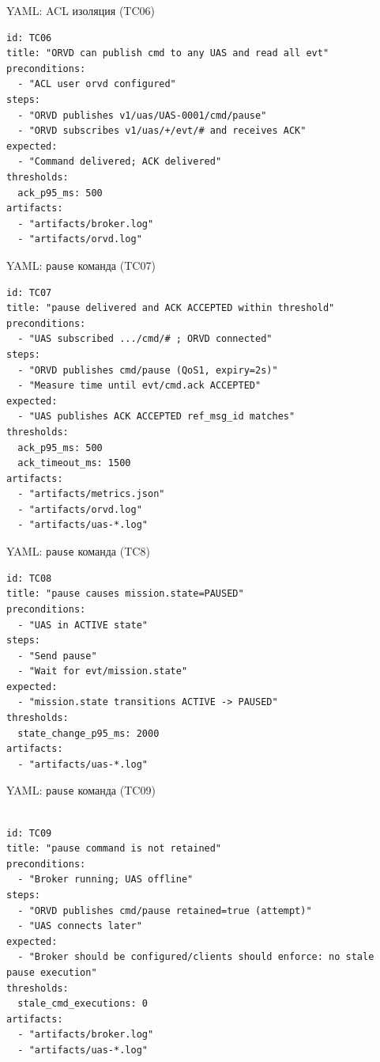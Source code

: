 \documentclass[aspectratio=169]{beamer}
\begin{document}
\begin{frame}[fragile]{YAML: ACL изоляция (TC06)}
\begin{Verbatim}[fontsize=\scriptsize, baselinestretch=0.85]  
  id: TC06
title: "ORVD can publish cmd to any UAS and read all evt"
preconditions:
  - "ACL user orvd configured"
steps:
  - "ORVD publishes v1/uas/UAS-0001/cmd/pause"
  - "ORVD subscribes v1/uas/+/evt/# and receives ACK"
expected:
  - "Command delivered; ACK delivered"
thresholds:
  ack_p95_ms: 500
artifacts:
  - "artifacts/broker.log"
  - "artifacts/orvd.log"
\end{Verbatim}
\end{frame}

\begin{frame}[fragile]{YAML: \texttt{pause} команда (TC07)}
\begin{Verbatim}[fontsize=\scriptsize, baselinestretch=0.85]
id: TC07
title: "pause delivered and ACK ACCEPTED within threshold"
preconditions:
  - "UAS subscribed .../cmd/# ; ORVD connected"
steps:
  - "ORVD publishes cmd/pause (QoS1, expiry=2s)"
  - "Measure time until evt/cmd.ack ACCEPTED"
expected:
  - "UAS publishes ACK ACCEPTED ref_msg_id matches"
thresholds:
  ack_p95_ms: 500
  ack_timeout_ms: 1500
artifacts:
  - "artifacts/metrics.json"
  - "artifacts/orvd.log"
  - "artifacts/uas-*.log"

\end{Verbatim}
\end{frame}

\begin{frame}[fragile]{YAML: \texttt{pause} команда (TC8)}
\begin{Verbatim}[fontsize=\scriptsize, baselinestretch=0.85]
id: TC08
title: "pause causes mission.state=PAUSED"
preconditions:
  - "UAS in ACTIVE state"
steps:
  - "Send pause"
  - "Wait for evt/mission.state"
expected:
  - "mission.state transitions ACTIVE -> PAUSED"
thresholds:
  state_change_p95_ms: 2000
artifacts:
  - "artifacts/uas-*.log"

\end{Verbatim}
\end{frame}

\begin{frame}[fragile]{YAML: \texttt{pause} команда (TC09)}
\begin{Verbatim}[fontsize=\scriptsize, baselinestretch=0.85]
  
id: TC09
title: "pause command is not retained"
preconditions:
  - "Broker running; UAS offline"
steps:
  - "ORVD publishes cmd/pause retained=true (attempt)"
  - "UAS connects later"
expected:
  - "Broker should be configured/clients should enforce: no stale pause execution"
thresholds:
  stale_cmd_executions: 0
artifacts:
  - "artifacts/broker.log"
  - "artifacts/uas-*.log"
\end{Verbatim}
\end{frame}
\end{document}
